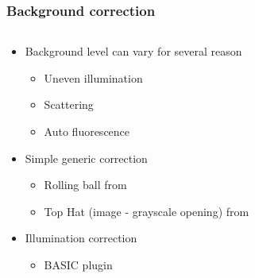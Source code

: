 \documentclass[ignorenonframetext,aspectratio=169,10pt,xcolor=table]{beamer}
\begin{document}
\begin{frame} \frametitle{Background correction}
  \begin{columns}
    \begin{column}{0.5\textwidth}
      \begin{itemize}
      \item Background level can vary for several reason
        \begin{itemize}
        \item Uneven illumination
        \item Scattering
        \item Auto fluorescence
        \end{itemize}
      \item Simple generic correction
        \begin{itemize}
        \item Rolling ball from 
        \item Top Hat (image - grayscale opening) from
        \end{itemize}
      \item Illumination correction
        \begin{itemize}
        \item BASIC plugin
        \end{itemize}
      \end{itemize}
    \end{column}
    \begin{column}{0.5\textwidth}
    \end{column}
\end{columns}
\end{frame}
\end{document}
